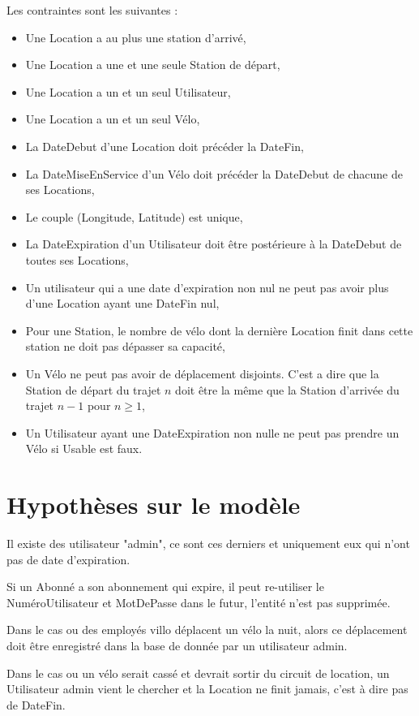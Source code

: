 \documentclass[a4paper,10pt]{article}
\begin{document}
Les contraintes sont les suivantes :
\begin{itemize}
  \item Une Location a au plus une station d'arrivé,
  \item Une Location a une et une seule Station de départ,
  \item Une Location a un et un seul Utilisateur,
  \item Une Location a un et un seul Vélo,
  \item La DateDebut d'une Location doit précéder la DateFin, 
  \item La DateMiseEnService d'un Vélo doit précéder la DateDebut de chacune de ses Locations,
  \item Le couple (Longitude, Latitude) est unique,
  \item La DateExpiration d'un Utilisateur doit \^etre postérieure à la DateDebut de toutes ses Locations,
  \item Un utilisateur qui a une date d'expiration non nul ne peut pas avoir plus d'une Location ayant une DateFin nul,
  \item Pour une Station, le nombre de vélo dont la dernière Location finit  dans cette station ne doit pas dépasser sa capacité,
  \item Un Vélo ne peut pas avoir de déplacement disjoints. C'est a dire que la Station de départ du trajet $n$ doit \^etre la même que la Station d'arrivée du trajet $n-1$ pour $n\ge1$,
  \item Un Utilisateur ayant une DateExpiration non nulle ne peut pas prendre un Vélo si Usable est faux.
\end{itemize}

\section{Hypothèses sur le modèle}

Il existe des utilisateur "admin", ce sont ces derniers et uniquement eux qui n'ont pas de date d'expiration.

Si un Abonné a son abonnement qui expire, il peut re-utiliser le NuméroUtilisateur et MotDePasse dans le futur, l'entité n'est pas supprimée.

Dans le cas ou des employés villo déplacent un vélo la nuit, alors ce déplacement doit être enregistré dans la base de donnée par un utilisateur admin.

Dans le cas ou un vélo serait cassé et devrait sortir du circuit de location, un Utilisateur admin vient le chercher et la Location ne finit jamais, c'est à dire pas de DateFin.
\end{document}
